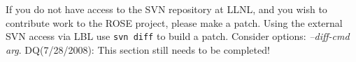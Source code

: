 \begin{enumerate}
%
%
%
%
%
%

\end{enumerate}

If you do not have access to the SVN repository at LLNL, and you wish to contribute
work to the ROSE project, please make a patch.  Using the external SVN access via
LBL use {\tt svn diff} to build a patch.
Consider options: {\em --diff-cmd arg}.
DQ(7/28/2008): This section still needs to be completed!



